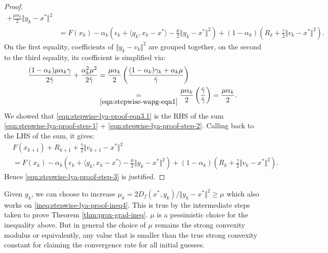 \documentclass[12pt]{article}
\begin{document}
\begin{proof}
\begin{align}
                +
                \frac{\mu\alpha_k}{2} \Vert y_k - x^*\Vert^2
            \nonumber
            \\&=
            F(x_k) - \alpha_k\left(
                \epsilon_k + \langle g_k, x_k - x^*\rangle
                - \frac{\mu}{2}\Vert y_k - x^*\Vert^2
            \right)
            +
            (1 - \alpha_k)\left(
                R_k + \frac{\gamma}{2}\Vert v_k - x^*\Vert^2
            \right).
        \end{align}
        On the first equality, coefficients of $\Vert y_k - v_k\Vert^2$ are grouped together, on the second to the third equality, its coefficient is simplified via:
        \begin{align*}
            \frac{(1 - \alpha_k)\mu\alpha_k\gamma}{2\hat \gamma} +
            \frac{\alpha_k^2 \mu^2}{2\hat \gamma}
            &=
            \frac{\mu\alpha_k}{2}\left(
                \frac{(1 - \alpha_k)\gamma_k + \alpha_k \mu}{\hat \gamma}
            \right)
            \\
            &\underset{\eqref{eqn:stepwise-wapg-eqn1}}{=} \frac{\mu\alpha_k}{2}\left(
                \frac{\hat \gamma}{\hat \gamma}
            \right) = \frac{\mu\alpha_k}{2}.
        \end{align*}
        We showed that \eqref{eqn:stepwise-lya-proof-eqn3.1} is the RHS of the sum \eqref{eqn:stepwise-lya-proof-step-1} + \eqref{eqn:stepwise-lya-proof-step-2}.
        Calling back to the LHS of the sum, it gives:
        \begin{align*}
            & F(x_{k + 1}) + R_{k + 1} +
            \frac{\hat \gamma}{2}\Vert v_{k + 1} - x^*\Vert^2
            \\
            &=
            F(x_k) - \alpha_k\left(
                \epsilon_k + \langle g_k, x_k - x^*\rangle
                - \frac{\mu}{2}\Vert y_k - x^*\Vert^2
            \right)
            +
            (1 - \alpha_k)\left(
                R_k + \frac{\gamma}{2}\Vert v_k - x^*\Vert^2
            \right).
        \end{align*}
        Hence \eqref{eqn:stepwise-lya-proof-step-3} is justified.
    \end{proof}
    \begin{remark}
        Given $y_k$, we can choose to increase $\mu_k = 2D_f(x^*, y_k)/\Vert y_k - x^*\Vert^2 \ge \mu$ which also works on \eqref{ineq:stepwise-lya-proof-ineq4}.
        This is true by the intermediate steps taken to prove Theorem \ref{thm:prox-grad-ineq}.
        $\mu$ is a pessimistic choice for the inequality above.
        But in general the choice of $\mu$ remains the strong convexity modulus or equivalently, any value that is smaller than the true strong convexity constant for claiming the convergence rate for all initial guesses.
    \end{remark}
\end{document}
